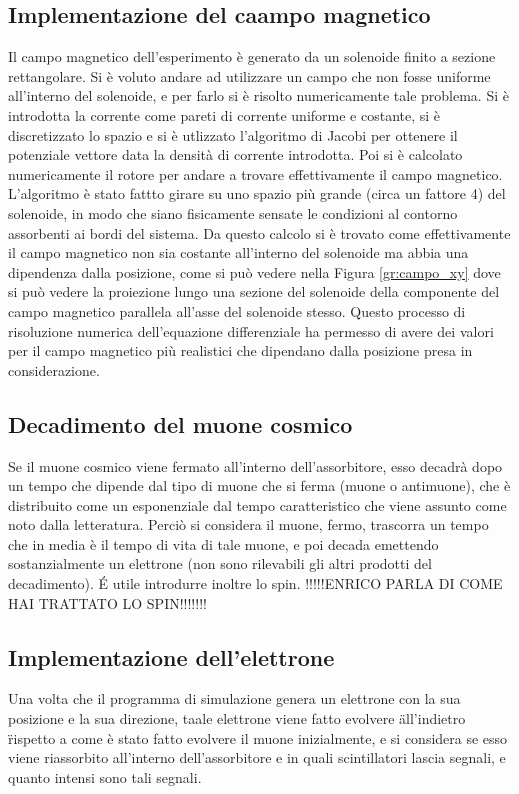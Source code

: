 \subsection{Implementazione del caampo magnetico}
Il campo magnetico dell'esperimento è generato da un solenoide finito a sezione rettangolare. Si è voluto andare ad utilizzare un campo che non fosse uniforme all'interno
del solenoide, e per farlo si è risolto numericamente tale problema. Si è introdotta la corrente come pareti di corrente uniforme e costante, si è discretizzato lo spazio
e si è utlizzato l'algoritmo di Jacobi per ottenere il potenziale vettore data la densità di corrente introdotta. Poi si è calcolato numericamente il rotore per
andare a trovare effettivamente il campo magnetico. L'algoritmo è stato fattto girare su uno spazio più grande (circa un fattore 4) del solenoide, in modo che siano
fisicamente sensate le condizioni al contorno assorbenti ai bordi del sistema. Da questo calcolo si è trovato come effettivamente il campo magnetico non sia costante
all'interno del solenoide ma abbia una dipendenza dalla posizione, come si può vedere nella Figura \ref{gr:campo_xy} dove si può vedere la proiezione lungo una
sezione del solenoide della componente del campo magnetico parallela all'asse del solenoide stesso. Questo processo di risoluzione numerica dell'equazione differenziale
ha permesso di avere dei valori per il campo magnetico più realistici che dipendano dalla posizione presa in considerazione.


\subsection{Decadimento del muone cosmico}
Se il muone cosmico viene fermato all'interno dell'assorbitore, esso decadrà dopo un tempo che dipende dal tipo di muone che si ferma (muone o antimuone), che è distribuito
come un esponenziale dal tempo caratteristico che viene assunto come noto dalla letteratura. Perciò si considera il muone, fermo, trascorra un tempo che in media è il tempo
di vita di tale muone, e poi decada emettendo sostanzialmente un elettrone (non sono rilevabili gli altri prodotti del decadimento). \'E utile introdurre inoltre lo spin.
!!!!!ENRICO PARLA DI COME HAI TRATTATO LO SPIN!!!!!!!

\subsection{Implementazione dell'elettrone}
Una volta che il programma di simulazione genera un elettrone con la sua posizione e la sua direzione, taale elettrone viene fatto evolvere \" all'indietro \" rispetto a
come è stato fatto evolvere il muone inizialmente, e si considera se esso viene riassorbito all'interno dell'assorbitore e in quali scintillatori lascia segnali, e quanto
intensi sono tali segnali.


